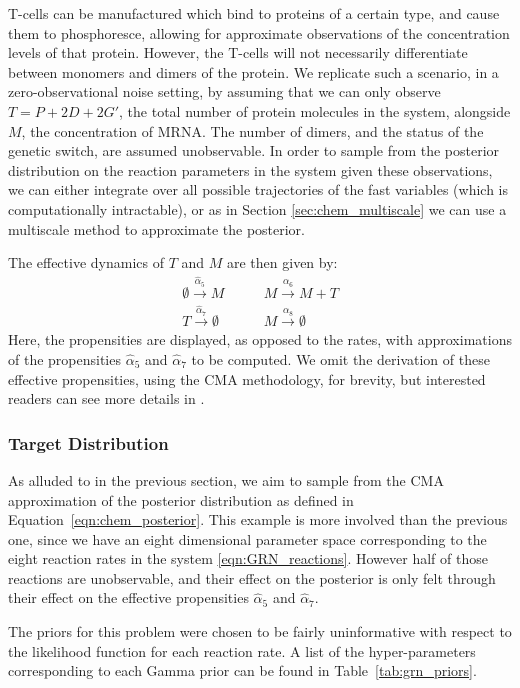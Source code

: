 \documentclass[final]{siamltex}
\begin{document}
T-cells can be manufactured which bind to
proteins of a certain type, and cause them to phosphoresce, allowing
for approximate observations of the concentration levels of that
protein. However, the T-cells will not necessarily differentiate
between monomers and dimers of the protein. We replicate such a
scenario, in a zero-observational noise setting, by assuming that we
can only observe $T=P + 2D + 2G'$, the total number of protein
molecules in the system, alongside $M$, the concentration of MRNA. The
number of dimers, and the status of the genetic switch, are assumed
unobservable. In
order to sample from the posterior distribution on the reaction
parameters in the system given these observations, we can either integrate over all possible
trajectories of the fast variables (which is computationally
intractable), or as in Section \ref{sec:chem_multiscale} we can use a
multiscale method to approximate the posterior. 

The effective dynamics of $T$ and $M$ are then given by:
\begin{align}
	\emptyset \xrightarrow{\hat{\alpha}_5} M \quad & \quad M\xrightarrow{\alpha_6} M+T  \label{eqn:GRN_eff} \\
	T \xrightarrow{\hat{\alpha}_7} \emptyset \quad & \quad M \xrightarrow{\alpha_8} \emptyset \nonumber
\end{align}
Here, the propensities are displayed, as opposed to the rates, with
approximations of the propensities $\hat{\alpha}_5$ and
$\hat{\alpha}_7$ to be computed. We omit the derivation of these
effective propensities, using the CMA methodology, for brevity, but
interested readers can see more details in \cite{russ2017parallel}.

\subsubsection{Target Distribution}
As alluded to in the previous section, we aim to sample from the CMA
approximation of the posterior distribution as defined in
Equation~\eqref{eqn:chem_posterior}. This example is more involved
than the previous one, since we have an eight dimensional parameter
space corresponding to the eight reaction rates in the system
\eqref{eqn:GRN_reactions}. However half of those reactions are
unobservable, and their effect on the posterior is only felt through
their effect on the effective propensities $\hat{\alpha}_5$ and $\hat{\alpha}_7$.

The priors for this problem were chosen to be fairly uninformative with respect to the likelihood function for each reaction rate. A list of the hyper-parameters corresponding to each Gamma prior can be found in Table~\ref{tab:grn_priors}.
\end{document}
